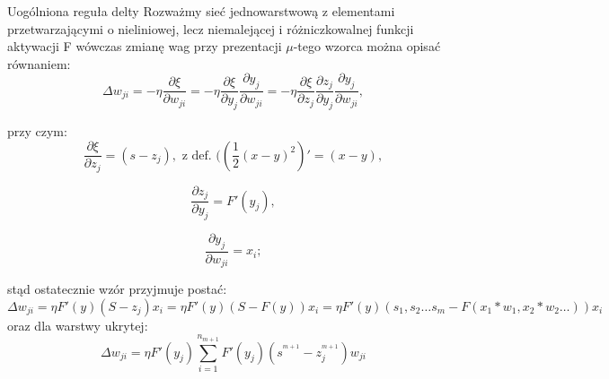 \begin{easyappendix}{Uogólniona reguła delty}
Rozważmy sieć jednowarstwową z elementami przetwarzającymi o nieliniowej, lecz niemalejącej i różniczkowalnej funkcji aktywacji F wówczas zmianę wag przy prezentacji \(\mu\)-tego wzorca  można opisać równaniem:
\begin{equation}
       \Delta w_{ji} = -\eta \frac {\partial \xi}{\partial w_{ji}} = - \eta \frac{\partial \xi}{\partial y_j} \frac{\partial y_j}{\partial w_{ji}} =
       - \eta \frac{\partial \xi}{\partial z_j} 
       \frac{\partial z_j}{\partial y_{j}}
       \frac{\partial y_j}{\partial w_{ji}},
\end{equation}

przy czym:
\begin{equation}
\frac{\partial \xi}{\partial z_j} = (s-z_j), \text{ z def. } ((\frac{1}{2}(x-y)^2 )' = (x-y),
\end{equation}

\begin{equation}
        \frac{\partial z_j}{\partial y_{j}} = F'(y_j),
\end{equation}

\begin{equation}
       \frac{\partial y_j}{\partial w_{ji}} = x_i;
\end{equation}

stąd ostatecznie wzór przyjmuje postać:
\begin{equation}
\Delta w_{ji}= \eta F'(y)(S-z_j)x_i = \eta F'(y)(S-F(y))x_i = \eta F'(y)(s_1, s_2  \dots s_m -F(x_1*w_1,x_2*w_2  \dots ))x_i
\end{equation}
oraz dla warstwy ukrytej:
\begin{equation}
\Delta w_{ji}= \eta F'(y_j) \sum_{i=1}^{n_{m+1}} {F'(y_j)(s^{^{m+1}}-z^{^{m+1}}_j)w_{ji}}
\end{equation}

\end{easyappendix}






